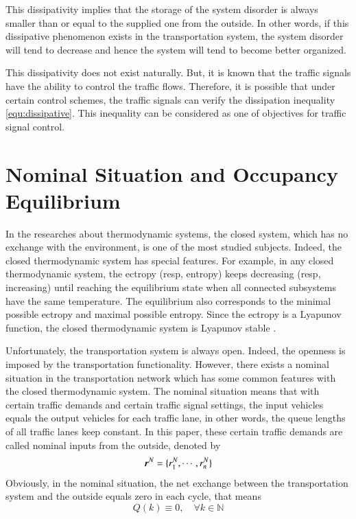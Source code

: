 \documentclass[preprint,authoryear,12pt]{elsarticle}
\renewcommand{\vec}[1]{\mbox{\boldmath$#1$}}
\begin{document}
This dissipativity implies that the storage of the system disorder is always smaller than or equal to the supplied one from the outside. In other words, if this dissipative phenomenon exists in the transportation system, the system disorder will tend to decrease and hence the system will tend to become better organized.

This dissipativity does not exist naturally. But, it is known that the traffic signals have the ability to control the traffic flows. Therefore, it is possible that under certain control schemes, the traffic signals can verify the dissipation inequality \eqref{equ:dissipative}. This inequality can be considered as one of objectives for traffic signal control.

\section{Nominal Situation and Occupancy Equilibrium}\label{sec:nominal}

In the researches about thermodynamic systems, the closed system, which has no exchange with the environment, is one of the most studied subjects. Indeed, the closed thermodynamic system has special features. For example, in any closed thermodynamic system, the ectropy (resp, entropy) keeps decreasing (resp, increasing) until reaching the equilibrium state when all connected subsystems have the same temperature. The equilibrium also corresponds to the minimal possible ectropy and maximal possible entropy. Since the ectropy is a Lyapunov function, the closed thermodynamic system is Lyapunov stable \citep{haddad_thermodynamic_2005}.

Unfortunately, the transportation system is always open. Indeed, the openness is imposed by the transportation functionality. However, there exists a nominal situation \citep{diakaki_multivariable_2002} in the transportation network which has some common features with the closed thermodynamic system. The nominal situation means that with certain traffic demands and certain traffic signal settings, the input vehicles equals the output vehicles for each traffic lane, in other words, the queue lengths of all traffic lanes keep constant. In this paper, these certain traffic demands are called nominal inputs from the outside, denoted by
$$\vec{r}^N=\{r_1^N,\cdots,r_n^N\}$$
Obviously, in the nominal situation, the net exchange between the transportation system and the outside equals zero in each cycle, that means
\begin{equation}\label{equ:nominal_exchange}
Q(k)\equiv 0, \quad \forall k\in\mathbb{N}
\end{equation}
\end{document}

